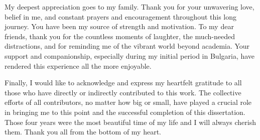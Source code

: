 My deepest appreciation goes to my family. Thank you for your unwavering love, belief in me, and constant prayers and encouragement throughout this long journey. You have been my source of strength and motivation.
To my dear friends, thank you for the countless moments of laughter, the much-needed distractions, and for reminding me of the vibrant world beyond academia. Your support and companionship, especially during my initial period in Bulgaria, have rendered this experience all the more enjoyable.

Finally, I would like to acknowledge and express my heartfelt gratitude to all those who have directly or indirectly contributed to this work. The collective efforts of all contributors, no matter how big or small, have played a crucial role in bringing me to this point and the successful completion of this dissertation.
Those four years were the most beautiful time of my life and I will always cherish them. Thank you all from the bottom of my heart.